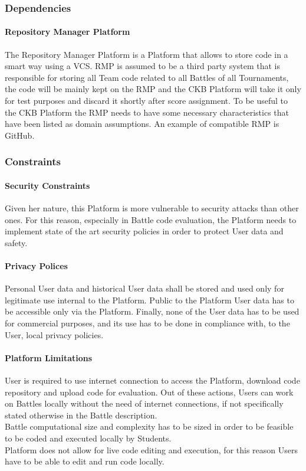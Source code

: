 \subsubsection{Dependencies}
\paragraph{Repository Manager Platform}
The Repository Manager Platform is a Platform that allows to store code in a smart way using a VCS.
RMP is assumed to be a third party system that is responsible for storing all Team code related to all Battles of all Tournaments, the code will be mainly kept on the RMP and the CKB Platform will take it only for test purposes and discard it shortly after score assignment. 
To be useful to the CKB Platform the RMP needs to have some necessary characteristics that have been listed as domain assumptions.
An example of compatible RMP is GitHub.

\subsubsection{Constraints}
\paragraph{Security Constraints}
Given her nature, this Platform is more vulnerable to security attacks than other ones. For this reason, especially in Battle code evaluation, the Platform needs to implement state of the art security policies in order to protect User data and safety.
\paragraph{Privacy Polices}
Personal User data and historical User data shall be stored and used only for legitimate use internal to the Platform. Public to the Platform User data has to be accessible only via the Platform. Finally, none of the User data has to be used for commercial purposes, and its use has to be done in compliance with, to the User, local privacy policies. 
\paragraph{Platform Limitations}
User is required to use internet connection to access the Platform, download code repository and upload code for evaluation. Out of these actions, Users can work on Battles locally without the need of internet connections, if not specifically stated otherwise in the Battle description.\\
Battle computational size and complexity has to be sized in order to be feasible to be coded and executed locally by Students.\\
Platform does not allow for live code editing and execution, for this reason Users have to be able to edit and run code locally.